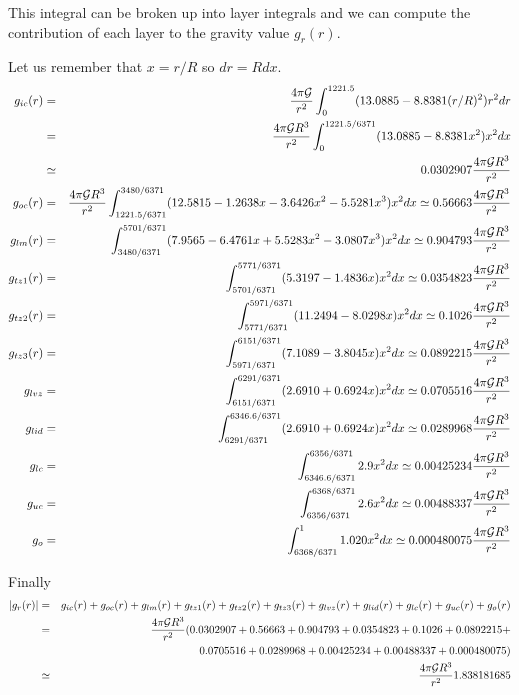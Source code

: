 This integral can be broken up into layer integrals and we can compute the contribution 
of each layer to the gravity value $g_r(r)$.

Let us remember that $x=r/R$ so $dr = R dx$. 
\begin{eqnarray}
g_{ic}(r)
&=&  \frac{4 \pi {\cal G}}{r^2} \int_0^{1221.5} (13.0885-8.8381 (r/R)^2) r^2 dr \nonumber\\
&=&  \frac{4 \pi {\cal G} R^3}{r^2}  \int_0^{1221.5/6371} (13.0885-8.8381 x^2) x^2 dx \nonumber\\
&\simeq& 0.0302907  \frac{4 \pi {\cal G} R^3}{r^2}\nonumber\\
g_{oc}(r)
&=&  \frac{4 \pi {\cal G} R^3}{r^2} 
\int_{1221.5/6371}^{3480/6371} (12.5815-1.2638x-3.6426x^2-5.5281x^3)x^2 dx 
\simeq 0.56663  \frac{4 \pi {\cal G} R^3}{r^2}\nonumber\\
g_{lm}(r) 
&=& \int_{3480/6371}^{5701/6371} (7.9565-6.4761x+5.5283x^2-3.0807x^3)x^2 dx 
\simeq 0.904793 \frac{4 \pi {\cal G} R^3}{r^2}\nonumber\\
g_{tz1}(r) 
&=& \int_{5701/6371}^{5771/6371} (5.3197-1.4836x)x^2 dx 
\simeq 0.0354823 \frac{4 \pi {\cal G} R^3}{r^2}\nonumber\\
g_{tz2}(r)
&=& \int_{5771/6371}^{5971/6371}   (11.2494-8.0298x)x^2 dx \simeq  0.1026 \frac{4 \pi {\cal G} R^3}{r^2}\nonumber\\
g_{tz3}(r)
&=& \int_{5971/6371}^{6151/6371}   (7.1089-3.8045x)x^2 dx  \simeq 0.0892215 \frac{4 \pi {\cal G} R^3}{r^2}\nonumber\\
g_{lvz} 
&=&  \int_{6151/6371}^{6291/6371} (2.6910+0.6924x) x^2 dx  \simeq  0.0705516 \frac{4 \pi {\cal G} R^3}{r^2}\nonumber\\
g_{lid}
&=& \int_{6291/6371}^{6346.6/6371} (2.6910+0.6924x)x^2 dx \simeq 0.0289968 \frac{4 \pi {\cal G} R^3}{r^2}\nonumber\\
g_{lc}
&=& \int_{6346.6/6371}^{6356/6371} 2.9 x^2 dx  \simeq 0.00425234 \frac{4 \pi {\cal G} R^3}{r^2}\nonumber\\
g_{uc}
&=& \int_{6356/6371}^{6368/6371} 2.6 x^2 dx  \simeq 0.00488337 \frac{4 \pi {\cal G} R^3}{r^2}\nonumber\\
g_{o}
&=& \int_{6368/6371}^{1} 1.020 x^2 dx  \simeq 0.000480075 \frac{4 \pi {\cal G} R^3}{r^2}
\end{eqnarray}


Finally 
\begin{eqnarray}
|g_r(r)| 
&=&  g_{ic}(r) + g_{oc}(r) + g_{lm}(r) + g_{tz1}(r) + g_{tz2}(r) + g_{tz3}(r) + 
g_{lvz}(r) + g_{lid}(r) + g_{lc}(r) + g_{uc}(r) + g_{o}(r) \nonumber\\
&=& 
\frac{4 \pi {\cal G} R^3}{r^2}
(
0.0302907 + 
0.56663 +
0.904793 +
0.0354823 +
0.1026 +
0.0892215+ \nonumber\\
&& 
0.0705516 +
0.0289968 +
0.00425234+
0.00488337+
0.000480075
  ) \nonumber\\
&\simeq& 
\frac{4 \pi {\cal G} R^3}{r^2} \nonumber
1.838181685
\end{eqnarray}

